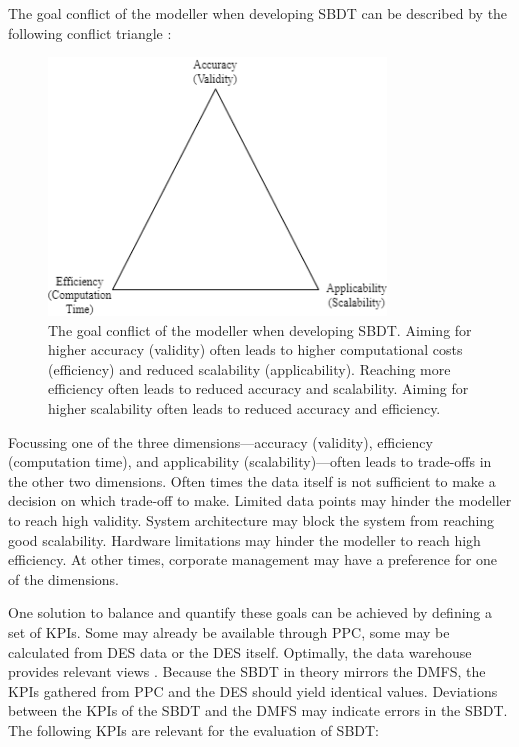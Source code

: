 The goal conflict of the modeller when developing SBDT can be described by the following conflict triangle \parencite{robinson2014simulation,balci2012life}:

\begin{figure}[htbp]
  \centering
  \includegraphics[width=0.8\textwidth]{figures/goals.png}
  \caption{The goal conflict of the modeller when developing SBDT. Aiming for higher accuracy (validity) often leads to higher computational costs (efficiency) and reduced scalability (applicability). Reaching more efficiency often leads to reduced accuracy and scalability. Aiming for higher scalability often leads to reduced accuracy and efficiency.}
  \label{fig:goals}
\end{figure}

Focussing one of the three dimensions—accuracy (validity), efficiency (computation time), and applicability (scalability)—often leads to trade-offs in the other two dimensions. Often times the data itself is not sufficient to make a decision on which trade-off to make. Limited data points may hinder the modeller to reach high validity. System architecture may block the system from reaching good scalability. Hardware limitations may hinder the modeller to reach high efficiency.
At other times, corporate management may have a preference for one of the dimensions.

One solution to balance and quantify these goals can be achieved by defining a set of KPIs. Some may already be available through PPC, some may be calculated from DES data or the DES itself. Optimally, the data warehouse provides relevant views \parencite{cui2020manufacturing}. Because the SBDT in theory mirrors the DMFS, the KPIs gathered from PPC and the DES should yield identical values. Deviations between the KPIs of the SBDT and the DMFS may indicate errors in the SBDT. The following KPIs are relevant for the evaluation of SBDT:

